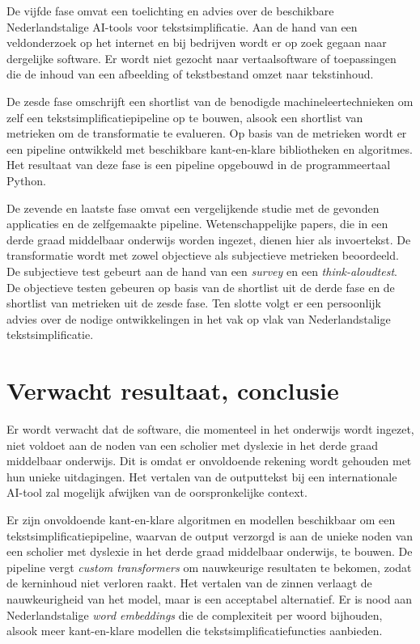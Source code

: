 De vijfde fase omvat een toelichting en advies over de beschikbare Nederlandstalige AI-tools voor tekstsimplificatie. Aan de hand van een veldonderzoek op het internet en bij bedrijven wordt er op zoek gegaan naar dergelijke software. Er wordt niet gezocht naar vertaalsoftware of toepassingen die de inhoud van een afbeelding of tekstbestand omzet naar tekstinhoud.

De zesde fase omschrijft een shortlist van de benodigde machineleertechnieken om zelf een tekstsimplificatiepipeline op te bouwen, alsook een shortlist van metrieken om de transformatie te evalueren. Op basis van de metrieken wordt er een pipeline ontwikkeld met beschikbare kant-en-klare bibliotheken en algoritmes. Het resultaat van deze fase is een pipeline opgebouwd in de programmeertaal Python. 

De zevende en laatste fase omvat een vergelijkende studie met de gevonden applicaties en de zelfgemaakte pipeline. Wetenschappelijke papers, die in een derde graad middelbaar onderwijs worden ingezet, dienen hier als invoertekst. De transformatie wordt met zowel objectieve als subjectieve metrieken beoordeeld. De subjectieve test gebeurt aan de hand van een \textit{survey} en een \textit{think-aloudtest}. De objectieve testen gebeuren op basis van de shortlist uit de derde fase en de shortlist van metrieken uit de zesde fase. Ten slotte volgt er een persoonlijk advies over de nodige ontwikkelingen in het vak op vlak van Nederlandstalige tekstsimplificatie.

\section{Verwacht resultaat, conclusie}
\label{sec:verwachte_resultaten}

Er wordt verwacht dat de software, die momenteel in het onderwijs wordt ingezet, niet voldoet aan de noden van een scholier met dyslexie in het derde graad middelbaar onderwijs. Dit is omdat er onvoldoende rekening wordt gehouden met hun unieke uitdagingen. Het vertalen van de outputtekst bij een internationale AI-tool zal mogelijk afwijken van de oorspronkelijke context. 

Er zijn onvoldoende kant-en-klare algoritmen en modellen beschikbaar om een tekstsimplificatiepipeline, waarvan de output verzorgd is aan de unieke noden van een scholier met dyslexie in het derde graad middelbaar onderwijs, te bouwen. De pipeline vergt \textit{custom transformers} om nauwkeurige resultaten te bekomen, zodat de kerninhoud niet verloren raakt. Het vertalen van de zinnen verlaagt de nauwkeurigheid van het model, maar is een acceptabel alternatief. Er is nood aan Nederlandstalige \textit{word embeddings} die de complexiteit per woord bijhouden, alsook meer kant-en-klare modellen die tekstsimplificatiefuncties aanbieden.